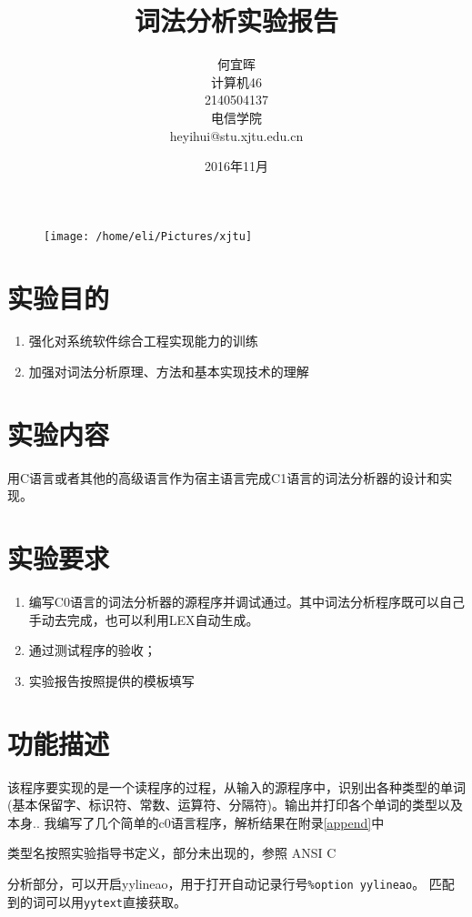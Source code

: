 \documentclass{article}
\date{2016年11月}
\title{词法分析实验报告}
\author{何宜晖\\计算机46\\2140504137\\电信学院\\heyihui@stu.xjtu.edu.cn}
\begin{document}
\begin{CJK}{UTF8}{gkai}
\begin{figure}
\centering
\texttt{[image: /home/eli/Pictures/xjtu]}
\end{figure}


\maketitle
\clearpage
\section{实验目的}
\begin{enumerate}
	\item 强化对系统软件综合工程实现能力的训练
	\item 加强对词法分析原理、方法和基本实现技术的理解
\end{enumerate}

\section{实验内容}
用C语言或者其他的高级语言作为宿主语言完成C1语言的词法分析器的设计和实现。

\section{实验要求}
\begin{enumerate}
\item 编写C0语言的词法分析器的源程序并调试通过。其中词法分析程序既可以自己手动去完成，也可以利用LEX自动生成。
\item 通过测试程序的验收； 
\item 实验报告按照提供的模板填写 
\end{enumerate}

\section{功能描述}
该程序要实现的是一个读程序的过程，从输入的源程序中，识别出各种类型的单词(基本保留字、标识符、常数、运算符、分隔符)。输出并打印各个单词的类型以及本身.\cite{chen2000}\cite{appel2004modern}\cite{louden2000}\cite{appel2006}.
我编写了几个简单的c0语言程序，解析结果在附录\ref{append}中

类型名按照实验指导书定义，部分未出现的，参照 ANSI C \cite{ansic}

分析部分，可以开启yylineao，用于打开自动记录行号\verb|%option yylineao|。
匹配到的词可以用\verb|yytext|直接获取。


\end{CJK}
\end{document}
